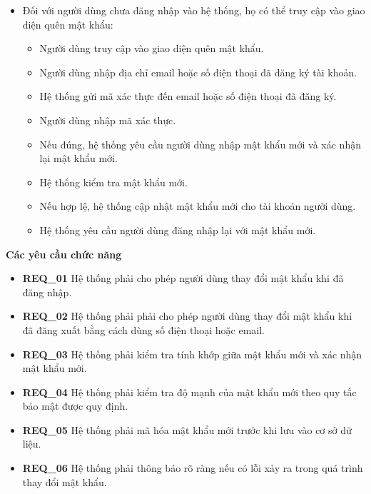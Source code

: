 \begin{itemize}
\begin{itemize}
    \end{itemize}

  \item Đối với người dùng chưa đăng nhập vào hệ thống, họ có thể truy cập vào giao diện quên mật khẩu:
    \begin{itemize}
      \item Người dùng truy cập vào giao diện quên mật khẩu.
      \item Người dùng nhập địa chỉ email hoặc số điện thoại đã đăng ký tài khoản.
      \item Hệ thống gửi mã xác thực đến email hoặc số điện thoại đã đăng ký.
      \item Người dùng nhập mã xác thực.
      \item Nếu đúng, hệ thống yêu cầu người dùng nhập mật khẩu mới và xác nhận lại mật khẩu mới.
      \item Hệ thống kiểm tra mật khẩu mới.
      \item Nếu hợp lệ, hệ thống cập nhật mật khẩu mới cho tài khoản người dùng.
      \item Hệ thống yêu cầu người dùng đăng nhập lại với mật khẩu mới.
    \end{itemize}
\end{itemize}

\noindent \textbf{Các yêu cầu chức năng}

\begin{itemize}

  \item \textbf{REQ\_01} Hệ thống phải cho phép người dùng thay đổi mật khẩu khi đã đăng nhập.

  \item \textbf{REQ\_02} Hệ thống phải phải cho phép người dùng thay đổi mật khẩu khi đã đăng xuất bằng cách dùng số điện thoại hoặc email.

  \item \textbf{REQ\_03} Hệ thống phải kiểm tra tính khớp giữa mật khẩu mới và xác nhận mật khẩu mới.

  \item \textbf{REQ\_04} Hệ thống phải kiểm tra độ mạnh của mật khẩu mới theo quy tắc bảo mật được quy định.

  \item \textbf{REQ\_05} Hệ thống phải mã hóa mật khẩu mới trước khi lưu vào cơ sở dữ liệu.

  \item \textbf{REQ\_06} Hệ thống phải thông báo rõ ràng nếu có lỗi xảy ra trong quá trình thay đổi mật khẩu.

\end{itemize}